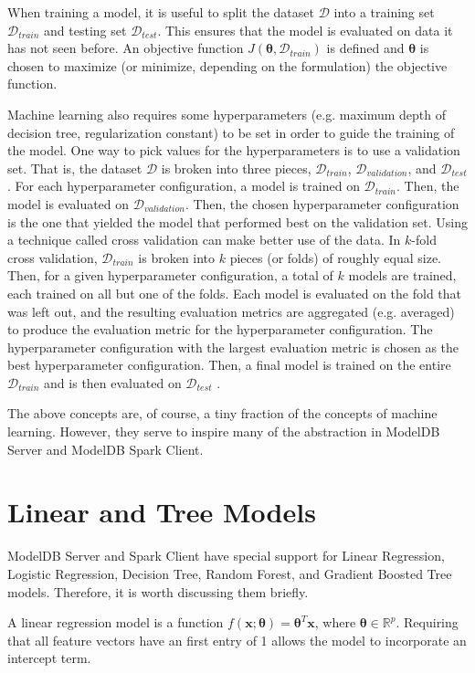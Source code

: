 When training a model, it is useful to split the dataset $\mathcal{D}$ into
a training set $\mathcal{D}_{train}$ and testing set $\mathcal{D}_{test}$. This ensures
that the model is evaluated on data it has not seen before. An objective function
$J(\boldsymbol{\theta}, \mathcal{D}_{train})$ is defined and $\boldsymbol{\theta}$ 
is chosen to maximize (or minimize, depending on the formulation) the objective function.

Machine learning also requires some hyperparameters (e.g. maximum depth of decision tree, regularization constant) 
to be set in order to guide the training of the model. One way to pick values for the hyperparameters
is to use a validation set. That is, the dataset $\mathcal{D}$ is broken into three pieces, 
$\mathcal{D}_{train}$, $\mathcal{D}_{validation}$, and $\mathcal{D}_{test}$. For each 
hyperparameter configuration, a model is trained on $\mathcal{D}_{train}$. Then, the model
is evaluated on $\mathcal{D}_{validation}$. Then, the chosen hyperparameter configuration
is the one that yielded the model that performed best on the validation set. 
Using a technique called cross validation can make better use of the data. In 
$k$-fold cross validation, $\mathcal{D}_{train}$ is broken into $k$ pieces (or folds) of roughly
equal size. Then, for a given hyperparameter configuration, a total of $k$ models are trained, each 
trained on all but one of the folds. Each model is evaluated on the fold that was left out,
and the resulting evaluation metrics are aggregated (e.g. averaged) to produce the evaluation
metric for the hyperparameter configuration. The hyperparameter configuration with the
largest evaluation metric is chosen as the best hyperparameter configuration. Then, a final
model is trained on the entire $\mathcal{D}_{train}$ and is then evaluated on $\mathcal{D}_{test}$ 
\cite{deeplearningbook}.

The above concepts are, of course, a tiny fraction of the concepts of machine learning. However,
they serve to inspire many of the abstraction in ModelDB Server and ModelDB Spark Client.

\section{Linear and Tree Models}
ModelDB Server and Spark Client have special support for Linear Regression, Logistic Regression, 
Decision Tree, Random Forest, and Gradient Boosted Tree models. Therefore, it is worth discussing
them briefly.

A linear regression model is a function $f(\textbf{x}; \boldsymbol{\theta}) = \boldsymbol{\theta}^{T}\textbf{x}$,
where $\boldsymbol{\theta} \in \mathbb{R}^{p}$. Requiring that all feature vectors have an first entry of 
1 allows the model to incorporate an intercept term.

